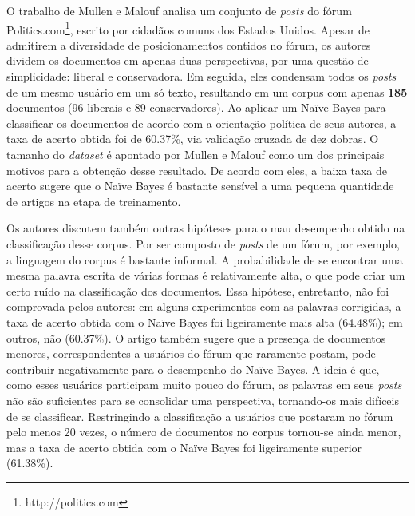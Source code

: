 O trabalho de Mullen e Malouf analisa um conjunto de \emph{posts} do fórum Politics.com\footnote{http://politics.com}, escrito por cidadãos comuns dos Estados Unidos. Apesar de admitirem a diversidade de posicionamentos contidos no fórum, os autores dividem os documentos em apenas duas perspectivas, por uma questão de simplicidade: liberal e conservadora. Em seguida, eles condensam todos os \emph{posts} de um mesmo usuário em um só texto, resultando em um corpus com apenas \textbf{185} documentos (96 liberais e 89 conservadores). Ao aplicar um Naïve Bayes para classificar os documentos de acordo com a orientação política de seus autores, a taxa de acerto obtida foi de 60.37\%, via validação cruzada de dez dobras. O tamanho do \emph{dataset} é apontado por Mullen e Malouf como um dos principais motivos para a obtenção desse resultado. De acordo com eles, a baixa taxa de acerto sugere que o Naïve Bayes é bastante sensível a uma pequena quantidade de artigos na etapa de treinamento. 


Os autores discutem também outras hipóteses para o mau desempenho obtido na classificação desse corpus. Por ser composto de \emph{posts} de um fórum, por exemplo, a linguagem do corpus é bastante informal. A probabilidade de se encontrar uma mesma palavra escrita de várias formas é relativamente alta, o que pode criar um certo ruído na classificação dos documentos. Essa hipótese, entretanto, não foi comprovada pelos autores: em alguns experimentos com as palavras corrigidas, a taxa de acerto obtida com o Naïve Bayes foi ligeiramente mais alta (64.48\%); em outros, não (60.37\%). O artigo também sugere que a presença de documentos menores, correspondentes a usuários do fórum que raramente postam, pode contribuir negativamente para o desempenho do Naïve Bayes. A ideia é que, como esses usuários participam muito pouco do fórum, as palavras em seus \emph{posts} não são suficientes para se consolidar uma perspectiva, tornando-os mais difíceis de se classificar. Restringindo a classificação a usuários que postaram no fórum pelo menos 20 vezes, o número de documentos no corpus tornou-se ainda menor, mas a taxa de acerto obtida com o Naïve Bayes foi ligeiramente superior (61.38\%). 

